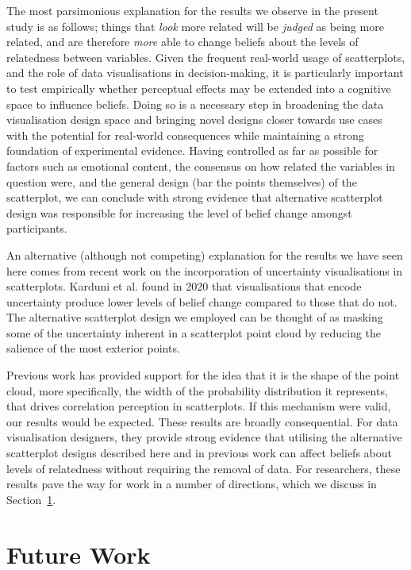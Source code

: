 \documentclass[sigconf]{acmart}
\begin{document}
The most parsimonious explanation for the results we observe in the
present study is as follows; things that \emph{look} more related will
be \emph{judged} as being more related, and are therefore \emph{more}
able to change beliefs about the levels of relatedness between
variables. Given the frequent real-world usage of scatterplots, and the
role of data visualisations in decision-making, it is particularly
important to test empirically whether perceptual effects may be extended
into a cognitive space to influence beliefs. Doing so is a necessary
step in broadening the data visualisation design space and bringing
novel designs closer towards use cases with the potential for real-world
consequences while maintaining a strong foundation of experimental
evidence. Having controlled as far as possible for factors such as
emotional content, the consensus on how related the variables in
question were, and the general design (bar the points themselves) of the
scatterplot, we can conclude with strong evidence that alternative
scatterplot design was responsible for increasing the level of belief
change amongst participants.

An alternative (although not competing) explanation for the results we
have seen here comes from recent work on the incorporation of
uncertainty visualisations in scatterplots. Karduni et al.
\citep{karduni_2020} found in 2020 that visualisations that encode
uncertainty produce lower levels of belief change compared to those that
do not. The alternative scatterplot design we employed can be thought of
as masking some of the uncertainty inherent in a scatterplot point cloud
by reducing the salience of the most exterior points.

Previous work has provided support for the idea that it is the shape of
the point cloud, more specifically, the width of the probability
distribution it represents, that drives correlation perception in
scatterplots. If this mechanism were valid, our results would be
expected. These results are broadly consequential. For data
visualisation designers, they provide strong evidence that utilising the
alternative scatterplot designs described here and in previous work can
affect beliefs about levels of relatedness without requiring the removal
of data. For researchers, these results pave the way for work in a
number of directions, which we discuss in Section~\ref{sec-future-work}.

\section{Future Work}\label{sec-future-work}
\end{document}
